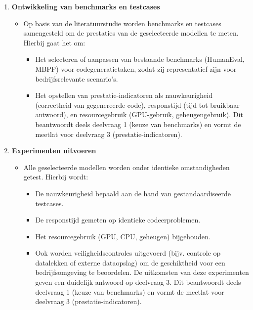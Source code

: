 \begin{enumerate}
    \item \textbf{Ontwikkeling van benchmarks en testcases}
    \begin{itemize}
        \item Op basis van de literatuurstudie worden benchmarks en testcases samengesteld om de prestaties van de geselecteerde modellen te meten. Hierbij gaat het om:
        \begin{itemize}
            \item Het selecteren of aanpassen van bestaande benchmarks (HumanEval, MBPP) voor codegeneratietaken, zodat zij representatief zijn voor bedrijfsrelevante scenario’s.
            \item Het opstellen van prestatie-indicatoren als nauwkeurigheid (correctheid van gegenereerde code), responstijd (tijd tot bruikbaar antwoord), en resourcegebruik (GPU-gebruik, geheugengebruik).
            Dit beantwoordt deels deelvraag 1 (keuze van benchmarks) en vormt de meetlat voor deelvraag 3 (prestatie-indicatoren).
        \end{itemize}
    \end{itemize}

    \item \textbf{Experimenten uitvoeren}
    \begin{itemize}
        \item Alle geselecteerde modellen worden onder identieke omstandigheden getest. Hierbij wordt:
        \begin{itemize}
            \item De nauwkeurigheid bepaald aan de hand van gestandaardiseerde testcases.
            \item De responstijd gemeten op identieke codeerproblemen.
            \item Het resourcegebruik (GPU, CPU, geheugen) bijgehouden.
            \item Ook worden veiligheidscontroles uitgevoerd (bijv. controle op datalekken of externe dataopslag) om de geschiktheid voor een bedrijfsomgeving te beoordelen.
            De uitkomsten van deze experimenten geven een duidelijk antwoord op deelvraag 3.
            Dit beantwoordt deels deelvraag 1 (keuze van benchmarks) en vormt de meetlat voor deelvraag 3 (prestatie-indicatoren).
        \end{itemize}
    \end{itemize}


\end{enumerate}
